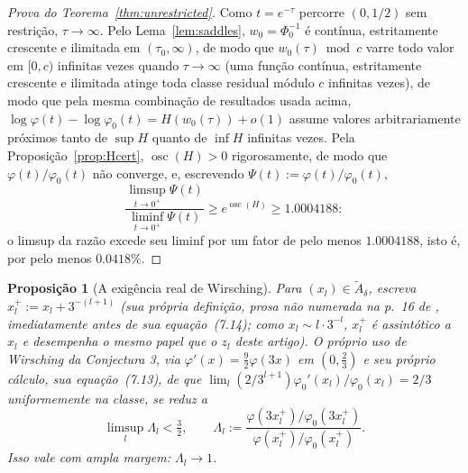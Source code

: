 \documentclass[11pt]{amsart}
\theoremstyle{plain}
\newtheorem{proposition}[theorem]{Proposição}
\theoremstyle{definition}
\theoremstyle{remark}
\begin{document}
\begin{proof}[Prova do Teorema~\ref{thm:unrestricted}]
Como $t=e^{-\tau}$ percorre $(0,1/2)$ sem restrição, $\tau\to\infty$. Pelo Lema~\ref{lem:saddles},
$w_0=\Phi_0^{-1}$ é contínua, estritamente crescente e ilimitada em $(\tau_0,\infty)$, de modo que
$w_0(\tau)\bmod c$ varre todo valor em $[0,c)$ infinitas vezes quando $\tau\to\infty$ (uma função
contínua, estritamente crescente e ilimitada atinge toda classe residual módulo $c$ infinitas
vezes), de modo que pela mesma combinação de resultados usada acima,
$\log\varphi(t)-\log\varphi_0(t) = H(w_0(\tau))+o(1)$ assume valores arbitrariamente próximos tanto
de $\sup H$ quanto de $\inf H$ infinitas vezes. Pela Proposição~\ref{prop:Hcert},
$\operatorname{osc}(H) > 0$ rigorosamente, de modo que $\varphi(t)/\varphi_0(t)$ não converge, e,
escrevendo $\Psi(t) := \varphi(t)/\varphi_0(t)$,
\[
\frac{\limsup_{t\to0^+}\Psi(t)}{\liminf_{t\to0^+}\Psi(t)} \ge e^{\operatorname{osc}(H)} \ge 1.0004188:
\]
o limsup da razão excede seu liminf por um fator de pelo menos $1.0004188$, isto é, por pelo menos
$0.0418\%$.
\end{proof}

\begin{proposition}[A exigência real de Wirsching]
\label{prop:wirschingreq}
Para $(x_l)\in\widetilde A_\delta$, escreva $x_l^+ := x_l + 3^{-(l+1)}$ (sua própria definição,
prosa não numerada na p.~16 de \cite{wirsching2003}, imediatamente antes de sua equação~(7.14);
como $x_l\sim l\cdot3^{-l}$, $x_l^+$ é assintótico a $x_l$ e desempenha o mesmo papel que o $z_l$
deste artigo). O próprio uso de Wirsching da Conjectura 3, via $\varphi'(x)=\tfrac92\varphi(3x)$ em
$(0,\tfrac23)$ e seu próprio cálculo, sua equação~(7.13), de que
$\lim_l (2/3^{l+1})\varphi_0'(x_l)/\varphi_0(x_l) = 2/3$ uniformemente na classe, se reduz a
\[
\limsup_l \Lambda_l < \tfrac32, \qquad
\Lambda_l := \frac{\varphi(3x_l^+)/\varphi_0(3x_l^+)}{\varphi(x_l^+)/\varphi_0(x_l^+)}.
\]
Isso vale com ampla margem: $\Lambda_l \to 1$.
\end{proposition}
\end{document}

